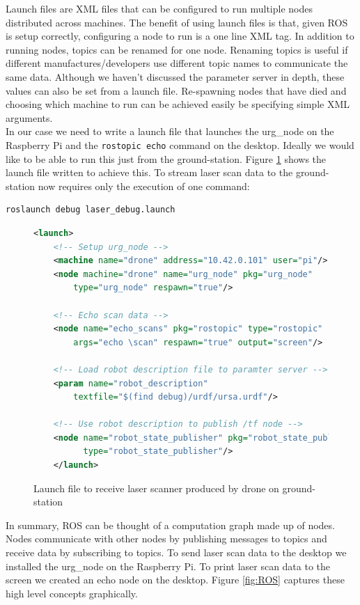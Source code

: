 \documentclass[capstone_report.tex]{subfiles}
\begin{document}
Launch files are XML files that can be configured to run multiple nodes distributed across machines.  The benefit of using launch files is that, given ROS is setup correctly, configuring a node to run is a one line XML tag.  In addition to running nodes, topics can be renamed for one node.  Renaming topics is useful if different manufactures/developers use different topic names to communicate the same data.  Although we haven’t discussed the parameter server in depth, these values can also be set from a launch file. Re-spawning nodes that have died and choosing which machine to run can be achieved easily be specifying simple XML arguments.\\

In our case we need to write a launch file that launches the urg\_node on the Raspberry Pi and the \texttt{rostopic echo} command on the desktop.  Ideally we would like to be able to run this just from the ground-station.  Figure \ref{fig:launch_file} shows the launch file written to achieve this.  To stream laser scan data to the ground-station now requires only the execution of one command: 

\begin{lstlisting}[language=bash]
    roslaunch debug laser_debug.launch
\end{lstlisting}

\begin{figure}[H]
    \centering
    \begin{lstlisting}[language=xml]
    <launch>
    <!-- Setup urg_node -->
    <machine name="drone" address="10.42.0.101" user="pi"/>
    <node machine="drone" name="urg_node" pkg="urg_node" 
        type="urg_node" respawn="true"/>

    <!-- Echo scan data -->
    <node name="echo_scans" pkg="rostopic" type="rostopic" 
        args="echo \scan" respawn="true" output="screen"/>

    <!-- Load robot description file to paramter server -->
    <param name="robot_description" 
        textfile="$(find debug)/urdf/ursa.urdf"/>

    <!-- Use robot description to publish /tf node -->
    <node name="robot_state_publisher" pkg="robot_state_publisher" 
          type="robot_state_publisher"/>
    </launch>
    \end{lstlisting}
    \caption{Launch file to receive laser scanner produced by drone on ground-station}
    \label{fig:launch_file}
\end{figure}

In summary, ROS can be thought of a computation graph made up of nodes.  Nodes communicate with other nodes by publishing messages to topics and receive data by subscribing to topics.  To send laser scan data to the desktop we installed the urg\_node on the Raspberry Pi.   To print laser scan data to the screen we created an echo node on the desktop.  Figure \ref{fig:ROS} captures these high level concepts graphically.
\end{document}

